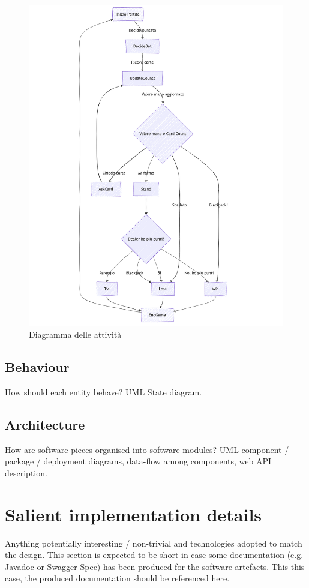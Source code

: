 \begin{figure}[ht]
    \centering
    \includegraphics[scale=0.55]{report/img/activityDiagram.png}
    \caption{Diagramma delle attività}
    \label{fig:activityDiagram}
\end{figure}

\section{Behaviour}
How should each entity behave? UML State diagram.

\section{Architecture}
How are software pieces organised into software modules? UML component / package /
deployment diagrams, data-flow among components, web API description.


\chapter{Salient implementation details}
Anything potentially interesting / non-trivial and technologies adopted to match the
design. This section is expected to be short in case some documentation (e.g. Javadoc
or Swagger Spec) has been produced for the software artefacts. This this case, the
produced documentation should be referenced here.


